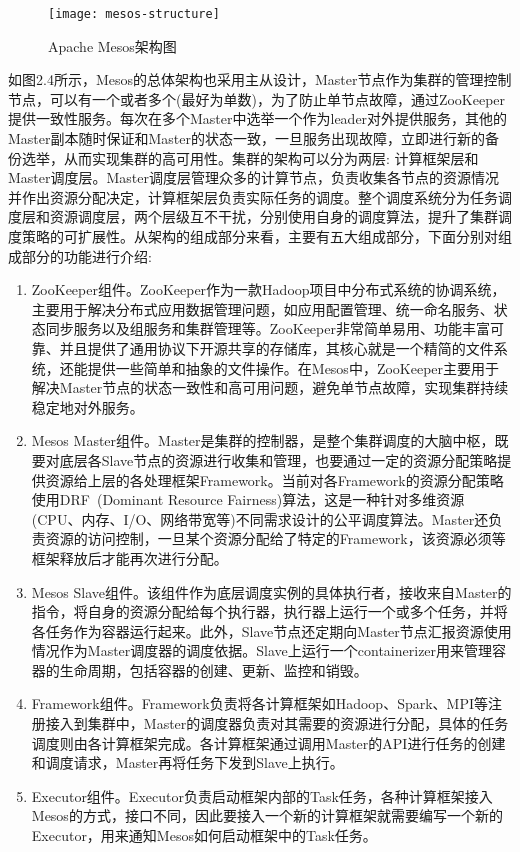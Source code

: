 \begin{figure}[H] %
	\centering
	\texttt{[image: mesos-structure]}
	\caption{Apache Mesos架构图}
\end{figure}

如图2.4所示，Mesos的总体架构也采用主从设计，Master节点作为集群的管理控制节点，可以有一个或者多个(最好为单数)，为了防止单节点故障，通过ZooKeeper提供一致性服务。每次在多个Master中选举一个作为leader对外提供服务，其他的Master副本随时保证和Master的状态一致，一旦服务出现故障，立即进行新的备份选举，从而实现集群的高可用性。集群的架构可以分为两层: 计算框架层和Master调度层。Master调度层管理众多的计算节点，负责收集各节点的资源情况并作出资源分配决定，计算框架层负责实际任务的调度。整个调度系统分为任务调度层和资源调度层，两个层级互不干扰，分别使用自身的调度算法，提升了集群调度策略的可扩展性。从架构的组成部分来看，主要有五大组成部分，下面分别对组成部分的功能进行介绍:
\begin{enumerate}[1.]
	\item ZooKeeper组件。ZooKeeper作为一款Hadoop项目中分布式系统的协调系统，主要用于解决分布式应用数据管理问题，如应用配置管理、统一命名服务、状态同步服务以及组服务和集群管理等。ZooKeeper非常简单易用、功能丰富可靠、并且提供了通用协议下开源共享的存储库，其核心就是一个精简的文件系统，还能提供一些简单和抽象的文件操作。在Mesos中，ZooKeeper主要用于解决Master节点的状态一致性和高可用问题，避免单节点故障，实现集群持续稳定地对外服务。
	\item Mesos Master组件。Master是集群的控制器，是整个集群调度的大脑中枢，既要对底层各Slave节点的资源进行收集和管理，也要通过一定的资源分配策略提供资源给上层的各处理框架Framework。当前对各Framework的资源分配策略使用DRF~\cite{DRF2011}(Dominant Resource Fairness)算法，这是一种针对多维资源(CPU、内存、I/O、网络带宽等)不同需求设计的公平调度算法。Master还负责资源的访问控制，一旦某个资源分配给了特定的Framework，该资源必须等框架释放后才能再次进行分配。
	\item Mesos Slave组件。该组件作为底层调度实例的具体执行者，接收来自Master的指令，将自身的资源分配给每个执行器，执行器上运行一个或多个任务，并将各任务作为容器运行起来。此外，Slave节点还定期向Master节点汇报资源使用情况作为Master调度器的调度依据。Slave上运行一个containerizer用来管理容器的生命周期，包括容器的创建、更新、监控和销毁。
	\item Framework组件。Framework负责将各计算框架如Hadoop、Spark、MPI等注册接入到集群中，Master的调度器负责对其需要的资源进行分配，具体的任务调度则由各计算框架完成。各计算框架通过调用Master的API进行任务的创建和调度请求，Master再将任务下发到Slave上执行。
	\item Executor组件。Executor负责启动框架内部的Task任务，各种计算框架接入Mesos的方式，接口不同，因此要接入一个新的计算框架就需要编写一个新的Executor，用来通知Mesos如何启动框架中的Task任务。
\end{enumerate}


